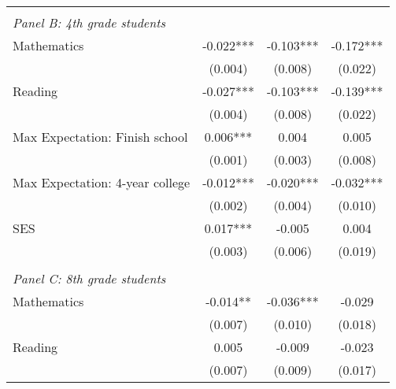 {\begin{tabular}{lccc}
&  &  &   \\
\multicolumn{4}{l}{\textit{Panel B: 4th grade students}} \\
\hspace{3mm}Mathematics&      -0.022***&      -0.103***&      -0.172***\\
                    &     (0.004)   &     (0.008)   &     (0.022)   \\
 
\hspace{3mm}Reading &      -0.027***&      -0.103***&      -0.139***\\
                    &     (0.004)   &     (0.008)   &     (0.022)   \\
 
\hspace{3mm}Max Expectation: Finish school&       0.006***&       0.004   &       0.005   \\
                    &     (0.001)   &     (0.003)   &     (0.008)   \\
 
\hspace{3mm}Max Expectation: 4-year college&      -0.012***&      -0.020***&      -0.032***\\
                    &     (0.002)   &     (0.004)   &     (0.010)   \\
 
\hspace{3mm}SES     &       0.017***&      -0.005   &       0.004   \\
                    &     (0.003)   &     (0.006)   &     (0.019)   \\
 
&  &  &   \\
\multicolumn{4}{l}{\textit{Panel C: 8th grade students}} \\
\hspace{3mm}Mathematics&      -0.014** &      -0.036***&      -0.029   \\
                    &     (0.007)   &     (0.010)   &     (0.018)   \\
 
\hspace{3mm}Reading &       0.005   &      -0.009   &      -0.023   \\
                    &     (0.007)   &     (0.009)   &     (0.017)   \\
 

\end{tabular}}
